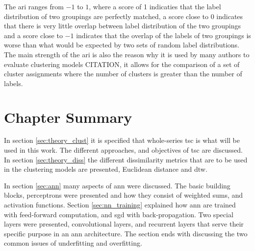 The \acrshort{ari} ranges from $-1$ to $1$, where a score of 1 indicaties that the label distribution of two groupings are perfectly matched, a score close to 0 indicates that there is very little overlap between label distribution of the two groupings and a score close to $-1$ indicates that the overlap of the labels of two groupings is worse than what would be expected by two sets of random label distributions. The main strength of the \acrshort{ari} is also the reason why it is used by many authors to evaluate clustering models CITATION, it allows for the comparison of a set of cluster assignments where the number of clusters is greater than the number of labels.

\section{Chapter Summary}

In section \ref{sec:theory_clust} it is specified that whole-series \acrshort{tsc} is what will be used in this work. The different approaches, and objectives of \acrshort{tsc} are discussed. In section \ref{sec:theory_diss} the different dissimilarity metrics that are to be used in the clustering models are presented, Euclidean distance and \acrshort{dtw}.

In section \ref{sec:ann} many aspects of \acrshort{ann} were discussed. The basic building blocks, perceptrons were presented and how they consist of weighted sums, and activation functions. Section \ref{sec:nn_training} explained how \acrshort{ann} are trained with feed-forward computation, and \acrshort{sgd} with back-propagation. Two special layers were presented, convolutional layers, and recurrent layers that serve their specific purpose in an \acrshort{ann} architecture. The section ends with discussing the two common issues of underfitting and overfitting. \bigskip
 
